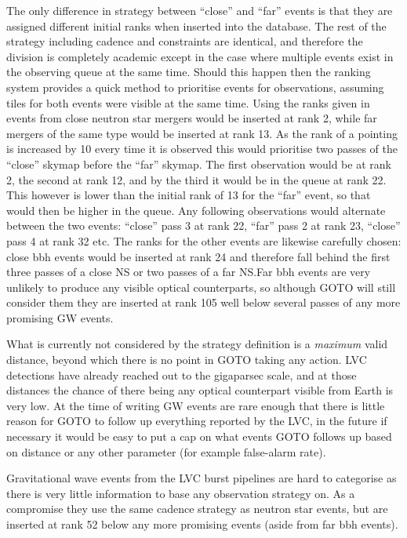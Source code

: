 \begin{colsection}
\begin{colsection}
The only difference in strategy between ``close'' and ``far'' events is that they are assigned different initial ranks when inserted into the database. The rest of the strategy including cadence and constraints are identical, and therefore the division is completely academic except in the case where multiple events exist in the observing queue at the same time. Should this happen then the ranking system provides a quick method to prioritise events for observations, assuming tiles for both events were visible at the same time. Using the ranks given in  events from close neutron star mergers would be inserted at rank 2, while far mergers of the same type would be inserted at rank 13. As the rank of a pointing is increased by 10 every time it is observed this would prioritise two passes of the ``close'' skymap before the ``far'' skymap. The first observation would be at rank 2, the second at rank 12, and by the third it would be in the queue at rank 22. This however is lower than the initial rank of 13 for the ``far'' event, so that would then be higher in the queue. Any following observations would alternate between the two events: ``close'' pass 3 at rank 22, ``far'' pass 2 at rank 23, ``close'' pass 4 at rank 32 etc. The ranks for the other events are likewise carefully chosen: close \gls{bbh} events would be inserted at rank 24 and therefore fall behind the first three passes of a close NS or two passes of a far NS.\@ Far \gls{bbh} events are very unlikely to produce any visible optical counterparts, so although GOTO will still consider them they are inserted at rank 105 well below several passes of any more promising GW events.

What is currently not considered by the strategy definition is a \textit{maximum} valid distance, beyond which there is no point in GOTO taking any action. LVC detections have already reached out to the gigaparsec scale, and at those distances the chance of there being any optical counterpart visible from Earth is very low. At the time of writing GW events are rare enough that there is little reason for GOTO to follow up everything reported by the LVC, in the future if necessary it would be easy to put a cap on what events GOTO follows up based on distance or any other parameter (for example false-alarm rate).

Gravitational wave events from the LVC burst pipelines are hard to categorise as there is very little information to base any observation strategy on. As a compromise they use the same cadence strategy as neutron star events, but are inserted at rank 52 below any more promising events (aside from far \gls{bbh} events).


\end{colsection}
\end{colsection}
